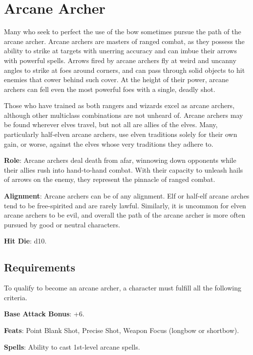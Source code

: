 \section{Arcane Archer}

\label{f0}				
Many who seek to perfect the use of the bow sometimes pursue the path of the arcane archer. Arcane archers are masters of ranged combat, as they possess the ability to strike at targets with unerring accuracy and can imbue their arrows with powerful spells. Arrows fired by arcane archers fly at weird and uncanny angles to strike at foes around corners, and can pass through solid objects to hit enemies that cower behind such cover. At the height of their power, arcane archers can fell even the most powerful foes with a single, deadly shot.
				
Those who have trained as both rangers and wizards excel as arcane archers, although other multiclass combinations are not unheard of. Arcane archers may be found wherever elves travel, but not all are allies of the elves. Many, particularly half-elven arcane archers, use elven traditions solely for their own gain, or worse, against the elves whose very traditions they adhere to.
				
\textbf{Role}: Arcane archers deal death from afar, winnowing down opponents while their allies rush into hand-to-hand combat. With their capacity to unleash hails of arrows on the enemy, they represent the pinnacle of ranged combat. 
				
\textbf{Alignment}: Arcane archers can be of any alignment. Elf or half-elf arcane arches tend to be free-spirited and are rarely lawful. Similarly, it is uncommon for elven arcane archers to be evil, and overall the path of the arcane archer is more often pursued by good or neutral characters.
				
\textbf{Hit Die}: d10.
				
\subsection{Requirements}

				
To qualify to become an arcane archer, a character must fulfill all the following criteria.
				
\textbf{Base Attack Bonus}: +6.
				
\textbf{Feats}: Point Blank Shot, Precise Shot, Weapon Focus (longbow or shortbow).
				
\textbf{Spells}: Ability to cast 1st-level arcane spells.
				
